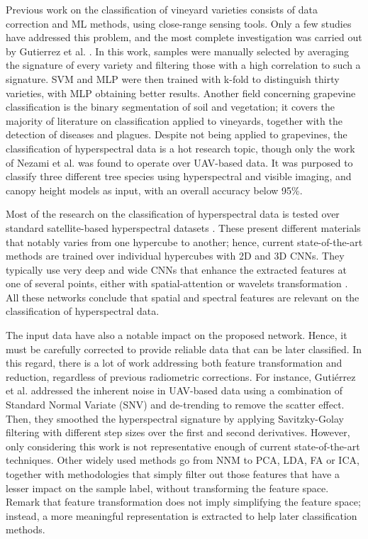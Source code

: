 Previous work on the classification of vineyard varieties consists of data correction and ML methods, using close-range sensing tools. Only a few studies have addressed this problem, and the most complete investigation was carried out by Gutierrez et al. \cite{gutierrez_--go_2018}. In this work, samples were manually selected by averaging the signature of every variety and filtering those with a high correlation to such a signature. SVM and MLP were then trained with k-fold to distinguish thirty varieties, with MLP obtaining better results. Another field concerning grapevine classification is the binary segmentation of soil and vegetation; it covers the majority of literature on classification applied to vineyards, together with the detection of diseases and plagues. Despite not being applied to grapevines, the classification of hyperspectral data is a hot research topic, though only the work of Nezami et al. \cite{nezami_tree_2020} was found to operate over UAV-based data. It was purposed to classify three different tree species using hyperspectral and visible imaging, and canopy height models as input, with an overall accuracy below 95\%.

Most of the research on the classification of hyperspectral data is tested over standard satellite-based hyperspectral datasets \cite{m_grana_hyperspectral_nodate}. These present different materials that notably varies from one hypercube to another; hence, current state-of-the-art methods are trained over individual hypercubes with 2D and 3D CNNs. They typically use very deep and wide CNNs \cite{moraga_jigsawhsi_2022} that enhance the extracted features at one of several points, either with spatial-attention \cite{xue_attention-based_2021, roy_attention-based_2021} or wavelets transformation \cite{chakraborty_spectralnet_2021}. All these networks conclude that spatial and spectral features are relevant on the classification of hyperspectral data.

The input data have also a notable impact on the proposed network. Hence, it must be carefully corrected to provide reliable data that can be later classified. In this regard, there is a lot of work addressing both feature transformation and reduction, regardless of previous radiometric corrections. For instance, Gutiérrez et al. \cite{gutierrez_--go_2018} addressed the inherent noise in UAV-based data using a combination of Standard Normal Variate (SNV) and de-trending to remove the scatter effect. Then, they smoothed the hyperspectral signature by applying Savitzky-Golay filtering with different step sizes over the first and second derivatives. However, only considering this work is not representative enough of current state-of-the-art techniques. Other widely used methods go from NNM to PCA, LDA, FA or ICA, together with methodologies that simply filter out those features that have a lesser impact on the sample label, without transforming the feature space. Remark that feature transformation does not imply simplifying the feature space; instead, a more meaningful representation is extracted to help later classification methods. 

